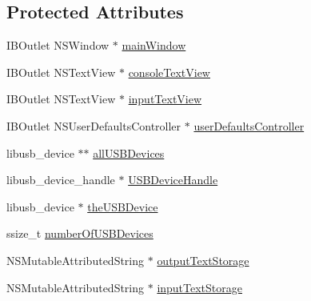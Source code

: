 \subsection*{Protected Attributes}
\begin{DoxyCompactItemize}
\item 
I\-B\-Outlet N\-S\-Window $\ast$ \hyperlink{interface_c_t_app_delegate_a0e5d80a8d3d78945c2b14d477a71c0eb}{main\-Window}
\item 
I\-B\-Outlet N\-S\-Text\-View $\ast$ \hyperlink{interface_c_t_app_delegate_a02680c24bf116eb7869cfe0489b2a381}{console\-Text\-View}
\item 
I\-B\-Outlet N\-S\-Text\-View $\ast$ \hyperlink{interface_c_t_app_delegate_abf8e0f79b36a4b23262ba2a2d29eabe7}{input\-Text\-View}
\item 
I\-B\-Outlet N\-S\-User\-Defaults\-Controller $\ast$ \hyperlink{interface_c_t_app_delegate_a55373d5265a108cb12510bd086aa15e8}{user\-Defaults\-Controller}
\item 
libusb\-\_\-device $\ast$$\ast$ \hyperlink{interface_c_t_app_delegate_a9d80eb0a8fb6f9c373648cba3dbe5b26}{all\-U\-S\-B\-Devices}
\item 
libusb\-\_\-device\-\_\-handle $\ast$ \hyperlink{interface_c_t_app_delegate_a0efa5af44bc03361f0953b7946461635}{U\-S\-B\-Device\-Handle}
\item 
libusb\-\_\-device $\ast$ \hyperlink{interface_c_t_app_delegate_ac20589aa72af723c196a1251c22fc093}{the\-U\-S\-B\-Device}
\item 
ssize\-\_\-t \hyperlink{interface_c_t_app_delegate_aab4901a3d0ce6c86771365bbf1645eeb}{number\-Of\-U\-S\-B\-Devices}
\item 
N\-S\-Mutable\-Attributed\-String $\ast$ \hyperlink{interface_c_t_app_delegate_a46c927de3b01529297fa0e078e486f19}{output\-Text\-Storage}
\item 
N\-S\-Mutable\-Attributed\-String $\ast$ \hyperlink{interface_c_t_app_delegate_a267286c82789444b42d30238c62b38bc}{input\-Text\-Storage}
\end{DoxyCompactItemize}
